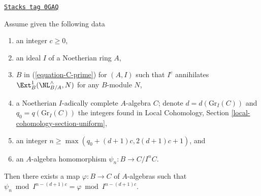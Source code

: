 \begin{lemma}
\label{restricted-lemma-get-morphism-general-better}
\href{https://stacks.math.columbia.edu/tag/0GAQ}{\texttt{Stacks tag 0GAQ}}

Assume given the following data
\begin{enumerate}
\item an integer $c \geq 0$,
\item an ideal $I$ of a Noetherian ring $A$,
\item $B$ in (\ref{equation-C-prime}) for $(A, I)$ such that
$I^c$ annihilates $\Ext^1_B(\NL_{B/A}^\wedge, N)$
for any $B$-module $N$,
\item a Noetherian $I$-adically complete $A$-algebra $C$; denote
$d = d(\text{Gr}_I(C))$ and $q_0 = q(\text{Gr}_I(C))$ the integers found in
Local Cohomology, Section \ref{local-cohomology-section-uniform},
\item an integer $n \geq \max(q_0 + (d + 1)c, 2(d + 1)c + 1)$, and
\item an $A$-algebra homomorphism $\psi_n : B \to C/I^nC$.
\end{enumerate}
Then there exists a map $\varphi : B \to C$ of $A$-algebras such
that $\psi_n \bmod I^{n - (d + 1)c} = \varphi \bmod I^{n - (d + 1)c}$.
\end{lemma}

